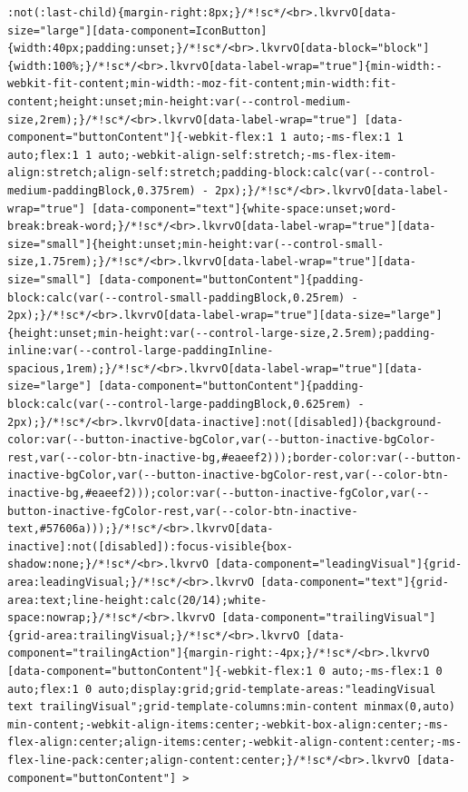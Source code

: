 \documentclass[
  letterpaper,
]{book}
\begin{document}
\begin{verbatim}
:not(:last-child){margin-right:8px;}/*!sc*/<br>.lkvrvO[data-size="large"][data-component=IconButton]{width:40px;padding:unset;}/*!sc*/<br>.lkvrvO[data-block="block"]{width:100%;}/*!sc*/<br>.lkvrvO[data-label-wrap="true"]{min-width:-webkit-fit-content;min-width:-moz-fit-content;min-width:fit-content;height:unset;min-height:var(--control-medium-size,2rem);}/*!sc*/<br>.lkvrvO[data-label-wrap="true"] [data-component="buttonContent"]{-webkit-flex:1 1 auto;-ms-flex:1 1 auto;flex:1 1 auto;-webkit-align-self:stretch;-ms-flex-item-align:stretch;align-self:stretch;padding-block:calc(var(--control-medium-paddingBlock,0.375rem) - 2px);}/*!sc*/<br>.lkvrvO[data-label-wrap="true"] [data-component="text"]{white-space:unset;word-break:break-word;}/*!sc*/<br>.lkvrvO[data-label-wrap="true"][data-size="small"]{height:unset;min-height:var(--control-small-size,1.75rem);}/*!sc*/<br>.lkvrvO[data-label-wrap="true"][data-size="small"] [data-component="buttonContent"]{padding-block:calc(var(--control-small-paddingBlock,0.25rem) - 2px);}/*!sc*/<br>.lkvrvO[data-label-wrap="true"][data-size="large"]{height:unset;min-height:var(--control-large-size,2.5rem);padding-inline:var(--control-large-paddingInline-spacious,1rem);}/*!sc*/<br>.lkvrvO[data-label-wrap="true"][data-size="large"] [data-component="buttonContent"]{padding-block:calc(var(--control-large-paddingBlock,0.625rem) - 2px);}/*!sc*/<br>.lkvrvO[data-inactive]:not([disabled]){background-color:var(--button-inactive-bgColor,var(--button-inactive-bgColor-rest,var(--color-btn-inactive-bg,#eaeef2)));border-color:var(--button-inactive-bgColor,var(--button-inactive-bgColor-rest,var(--color-btn-inactive-bg,#eaeef2)));color:var(--button-inactive-fgColor,var(--button-inactive-fgColor-rest,var(--color-btn-inactive-text,#57606a)));}/*!sc*/<br>.lkvrvO[data-inactive]:not([disabled]):focus-visible{box-shadow:none;}/*!sc*/<br>.lkvrvO [data-component="leadingVisual"]{grid-area:leadingVisual;}/*!sc*/<br>.lkvrvO [data-component="text"]{grid-area:text;line-height:calc(20/14);white-space:nowrap;}/*!sc*/<br>.lkvrvO [data-component="trailingVisual"]{grid-area:trailingVisual;}/*!sc*/<br>.lkvrvO [data-component="trailingAction"]{margin-right:-4px;}/*!sc*/<br>.lkvrvO [data-component="buttonContent"]{-webkit-flex:1 0 auto;-ms-flex:1 0 auto;flex:1 0 auto;display:grid;grid-template-areas:"leadingVisual text trailingVisual";grid-template-columns:min-content minmax(0,auto) min-content;-webkit-align-items:center;-webkit-box-align:center;-ms-flex-align:center;align-items:center;-webkit-align-content:center;-ms-flex-line-pack:center;align-content:center;}/*!sc*/<br>.lkvrvO [data-component="buttonContent"] > 
\end{verbatim}
\end{document}
